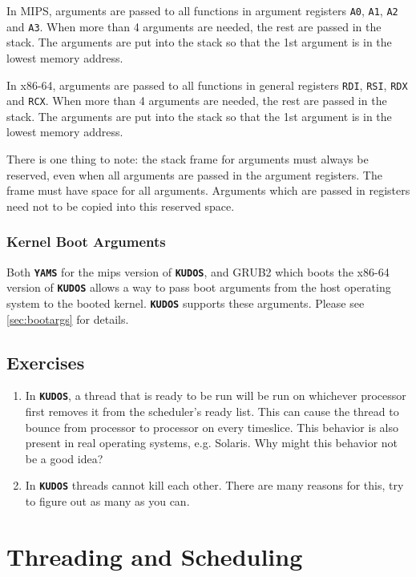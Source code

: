 \documentclass[twoside,a4paper]{report}
\newcommand{\kudos}{\texttt{\textbf{KUDOS}}}
\newcommand{\yams}{\texttt{\textbf{YAMS}}}
\newenvironment{exercises}[1][\addcontentsline{toc}{section}{Exercises}%
\section*{Exercises}\markright{EXERCISES}]{%
#1%
\begin{enumerate}%
}{%
\end{enumerate}
}
\newcounter{exercisec}[chapter]
\newcommand{\exercise}[1]{%
\item[\stepcounter{exercisec}\arabic{chapter}.\theexercisec{}.] #1%
}
\begin{document}
In MIPS, arguments are passed to all functions in argument registers
\texttt{A0}, \texttt{A1}, \texttt{A2} and \texttt{A3}. When more than
4 arguments are needed, the rest are passed in the stack. The
arguments are put into the stack so that the 1st argument is in the
lowest memory address.

In x86-64, arguments are passed to all functions in general registers
\texttt{RDI}, \texttt{RSI}, \texttt{RDX} and \texttt{RCX}. When more than
4 arguments are needed, the rest are passed in the stack. The
arguments are put into the stack so that the 1st argument is in the
lowest memory address.

There is one thing to note: the stack frame for arguments must always
be reserved, even when all arguments are passed in the argument
registers. The frame must have space for all arguments. Arguments
which are passed in registers need not to be copied into this reserved
space.

\subsection{Kernel Boot Arguments}


Both \yams{} for the mips version of \kudos{}, and GRUB2 which boots 
the x86-64 version of \kudos{} allows a way to pass boot arguments from the
host operating system to the booted kernel. \kudos{} supports these
arguments. Please see \autoref{sec:bootargs} for details.


\begin{exercises}

\exercise{In \kudos{}, a thread that is ready to be run will be run
on whichever processor first removes it from the scheduler's ready
list. This can cause the thread to bounce from processor to processor on
every timeslice. This behavior is also present in real operating
systems, e.g. Solaris. Why might this behavior not be a good idea?}

\exercise{In \kudos{} threads cannot kill each other. There are many
reasons for this, try to figure out as many as you can.}

\end{exercises}


\chapter{Threading and Scheduling}
\label{sec:threading}
\end{document}
